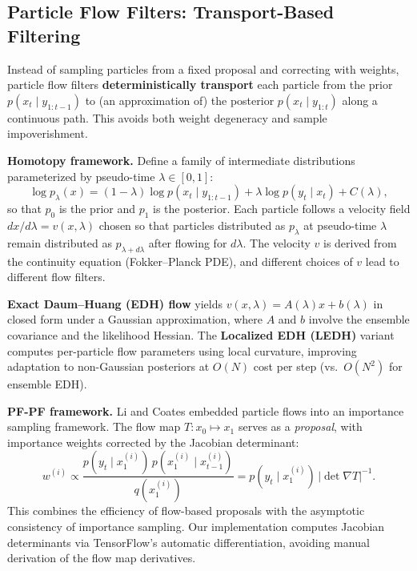 \documentclass[12pt,a4paper]{article}
\theoremstyle{definition}
\theoremstyle{remark}
\begin{document}
\subsection{Particle Flow Filters: Transport-Based Filtering}
\label{sec:bg-pff}

Instead of sampling particles from a fixed proposal and correcting with weights, particle flow filters \textbf{deterministically transport} each particle from the prior $p(x_t \mid y_{1:t-1})$ to (an approximation of) the posterior $p(x_t \mid y_{1:t})$ along a continuous path. This avoids both weight degeneracy and sample impoverishment.

\textbf{Homotopy framework.} Define a family of intermediate distributions parameterized by pseudo-time $\lambda \in [0, 1]$:
\begin{equation}
	\log p_\lambda(x) = (1 - \lambda) \log p(x_t \mid y_{1:t-1}) + \lambda \log p(y_t \mid x_t) + C(\lambda), \label{eq:homotopy}
\end{equation}
so that $p_0$ is the prior and $p_1$ is the posterior. Each particle follows a velocity field $dx / d\lambda = v(x, \lambda)$ chosen so that particles distributed as $p_\lambda$ at pseudo-time $\lambda$ remain distributed as $p_{\lambda + d\lambda}$ after flowing for $d\lambda$. The velocity $v$ is derived from the continuity equation (Fokker--Planck PDE), and different choices of $v$ lead to different flow filters.

\textbf{Exact Daum--Huang (EDH) flow} \citep{daum2010,daum2011} yields $v(x, \lambda) = A(\lambda) x + b(\lambda)$ in closed form under a Gaussian approximation, where $A$ and $b$ involve the ensemble covariance and the likelihood Hessian. The \textbf{Localized EDH (LEDH)} variant computes per-particle flow parameters using local curvature, improving adaptation to non-Gaussian posteriors at $O(N)$ cost per step (vs.\ $O(N^2)$ for ensemble EDH).

\textbf{PF-PF framework.} Li and Coates \citep{li2017} embedded particle flows into an importance sampling framework. The flow map $T: x_0 \mapsto x_1$ serves as a \emph{proposal}, with importance weights corrected by the Jacobian determinant:
\begin{equation}
	w^{(i)} \propto \frac{p(y_t \mid x_1^{(i)}) \, p(x_1^{(i)} \mid x_{t-1}^{(i)})}{q(x_1^{(i)})} = p(y_t \mid x_1^{(i)}) \, |\det \nabla T|^{-1}.
\end{equation}
This combines the efficiency of flow-based proposals with the asymptotic consistency of importance sampling. Our implementation computes Jacobian determinants via TensorFlow's automatic differentiation, avoiding manual derivation of the flow map derivatives.
\end{document}
